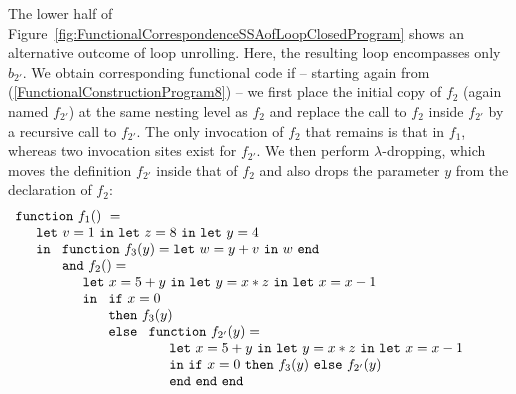 The lower half of
Figure~\ref{fig:FunctionalCorrespondenceSSAofLoopClosedProgram} shows
an alternative outcome of loop unrolling. Here, the resulting loop
encompasses only $b_{2'}$. We obtain corresponding functional code if --
starting again from (\ref{FunctionalConstructionProgram8}) -- we first
place the initial copy of $f_2$ (again named $f_{2'}$) at the same
nesting level as $f_2$ and replace the call to $f_2$ inside $f_{2'}$ by a
recursive call to $f_{2'}$. The only invocation of $f_2$ that remains is
that in $f_1$, whereas two invocation sites exist for $f_{2'}$. We then
perform $\lambda$-dropping, which moves the definition $f_{2'}$ inside
that of $f_2$ and also drops the parameter $y$ from the declaration of
$f_2$:
\begin{equation}
\label{FunctionalConstructionProgram10}
\begin{array}{l}
\mathtt{function}\ f_1()\ = \\
  \quad
  \begin{array}{l}
     \mathtt{let}\ v = 1 \ 
     \mathtt{in\ let}\ z = 8 \ 
     \mathtt{in\ let}\ y = 4\\
     \mathtt{in}\ 
     \begin{array}[t]{l}
       \mathtt{function}\ f_3(y) = 
          \mathtt{let}\ w = y+v\ \mathtt{in}\ w\ \mathtt{end}\\
       \mathtt{and}\ f_2() =\\
         \quad
         \begin{array}{l}
           \mathtt{let}\ x = 5+y\
           \mathtt{in\ let}\ y = x*z\
           \mathtt{in\ let}\ x = x-1\\
           \mathtt{in}\
           \begin{array}[t]{l}
             \mathtt{if}\ x=0\\
             \mathtt{then}\ f_3(y)\\ 
             \mathtt{else}\
               \begin{array}[t]{l}
                 \mathtt{function}\ f_{2'}(y) =\\
                 \quad
                 \begin{array}{l}
                   \mathtt{let}\ x = 5+y\
                   \mathtt{in\ let}\ y = x*z\
                   \mathtt{in\ let}\ x = x-1\\
                   \mathtt{in}\
                     \mathtt{if}\ x=0\
                     \mathtt{then}\ f_3(y)\ 
                     \mathtt{else}\ f_{2'}(y)\\
                   \mathtt{end\ end\ end}

\end{array}
\end{array}
\end{array}
\end{array}
\end{array}
\end{array}
\end{array}
\end{equation}
